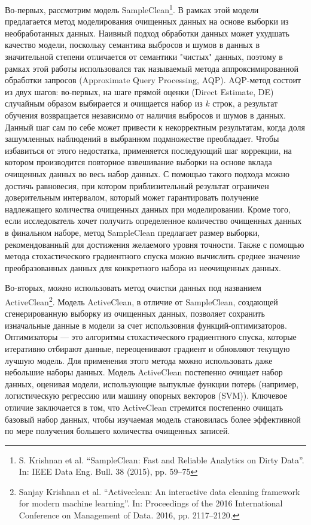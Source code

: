 \documentclass[12pt,a4paper, oneside]{extreport}
\begin{document}
Во-первых, рассмотрим модель  SampleClean\footnote{S. Krishnan et al. “SampleClean: Fast and Reliable Analytics on Dirty Data”. In: IEEE Data 	Eng. Bull. 38 (2015), pp. 59–75}. В рамках этой модели предлагается метод моделирования очищенных данных на основе выборки из необработанных данных. Наивный подход обработки данных может ухудшать качество модели, поскольку семантика выбросов и шумов в данных в значительной степени отличается от семантики "чистых" данных, поэтому в рамках этой работы использовался так называемый метода аппроксимированной обработки  запросов (Approximate
Query Processing, AQP). AQP-метод  состоит из двух шагов: во-первых, на шаге прямой оценки (Direct Estimate, DE)  случайным образом  выбирается  и очищается набор  из $k$ строк, а результат обучения возвращается независимо от наличия выбросов и шумов в данных. Данный шаг сам по себе может привести к некорректным результатам, когда доля зашумленных наблюдений в выбранном подмножестве преобладает. Чтобы избавиться от этого недостатка, применяется последующий  шаг коррекции, на котором производится повторное взвешивание выборки на основе вклада очищенных данных во весь набор данных.
С помощью такого подхода можно достичь равновесия, при котором приблизительный результат  ограничен доверительным интервалом, который может гарантировать получение надлежащего количества очищенных данных при моделировании. Кроме того, если исследователь хочет получить определенное количество очищенных  данных в финальном наборе, метод SampleClean предлагает размер выборки, рекомендованный для достижения желаемого уровня точности. Также с  помощью метода стохастического градиентного спуска можно  вычислить среднее значение преобразованных данных для конкретного набора из неочищенных данных.  

Во-вторых, можно использовать  метод  очистки данных под названием ActiveClean\footnote{Sanjay Krishnan et al. “Activeclean: An interactive data cleaning framework for modern machine 	learning”. In: Proceedings of the 2016 International Conference on Management of Data. 2016, 	pp. 2117–2120.}.  Модель ActiveClean, в отличие от SampleClean, создающей сгенерированную выборку из очищенных данных, позволяет сохранить изначальные данные в модели за счет использовния функций-оптимизаторов. Оптимизаторы — это алгоритмы стохастического  градиентного  спуска, которые итеративно отбирают данные, переоценивают градиент и обновляют текущую лучшую модель. 
Для применения  этого метода можно использовать даже небольшие наборы данных. 
Модель ActiveClean постепенно очищает набор данных, оценивая модели, использующие выпуклые функции потерь (например, логистическую  регрессию  или  машину опорных векторов (SVM)). Ключевое отличие заключается в том, что ActiveClean стремится постепенно очищать базовый набор данных, чтобы изучаемая  модель становилась более эффективной по мере получения большего количества очищенных записей. 
\end{document}
